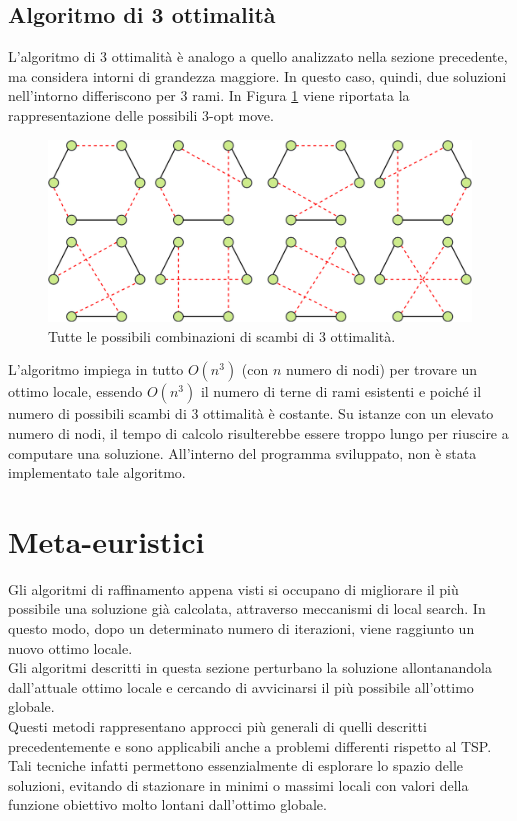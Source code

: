 \subsection{Algoritmo di 3 ottimalità}
L'algoritmo di 3 ottimalità è analogo a quello analizzato nella sezione precedente, ma considera intorni di grandezza maggiore. In questo caso, quindi, due soluzioni nell'intorno differiscono per 3 rami. In Figura \ref{three_optimality} viene riportata la rappresentazione delle possibili 3-opt move.\\
\begin{figure}[H] 
\begin{center} 
  \includegraphics[scale=0.35]{Images/3_swap}
  \caption{\footnotesize{Tutte le possibili combinazioni di scambi di 3 ottimalità.}}
  \label{three_optimality}
\end{center}
\end{figure}
L'algoritmo impiega in tutto $O(n^3)$ (con $n$ numero di nodi) per trovare un ottimo locale, essendo $O(n^3)$ il numero di terne di rami esistenti e poiché il numero di possibili scambi di 3 ottimalità è costante. Su istanze con un elevato numero di nodi, il tempo di calcolo risulterebbe essere troppo lungo per riuscire a computare una soluzione. All'interno del programma sviluppato, non è stata implementato tale algoritmo.

\section{Meta-euristici}
Gli algoritmi di raffinamento appena visti si occupano di migliorare il più possibile una soluzione già calcolata, attraverso meccanismi di local search. In questo modo, dopo un determinato numero di iterazioni, viene raggiunto un nuovo ottimo locale.\\
Gli algoritmi descritti in questa sezione perturbano la soluzione allontanandola dall'attuale ottimo locale e cercando di avvicinarsi il più possibile all'ottimo globale.\\
Questi metodi rappresentano approcci più generali di quelli descritti precedentemente e sono applicabili anche a problemi differenti rispetto al TSP. Tali tecniche infatti permettono essenzialmente di esplorare lo spazio delle soluzioni, evitando di stazionare in minimi o massimi locali con valori della funzione obiettivo molto lontani dall'ottimo globale.

